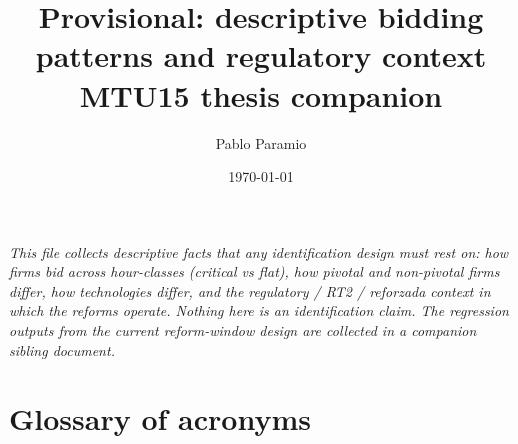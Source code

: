 \documentclass[11pt,a4paper]{article}
\title{Provisional: descriptive bidding patterns and regulatory context\\[3pt]\large MTU15 thesis companion}
\author{Pablo Paramio}
\date{\today}
\begin{document}
\maketitle

\noindent\emph{This file collects descriptive facts that any identification design must rest on: how firms bid across hour-classes (critical vs flat), how pivotal and non-pivotal firms differ, how technologies differ, and the regulatory / RT2 / reforzada context in which the reforms operate. Nothing here is an identification claim. The regression outputs from the current reform-window design are collected in a companion sibling document.}


\tableofcontents

\clearpage

\section*{Glossary of acronyms}\label{sec:bid_internal:glossary}
\end{document}
